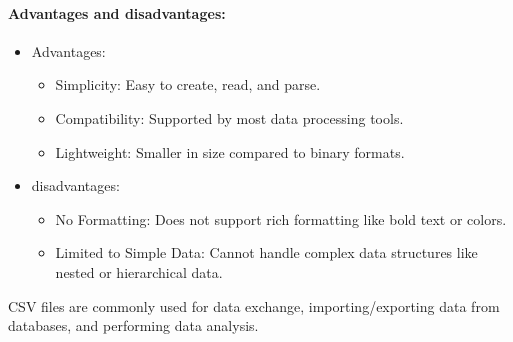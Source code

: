\documentclass[12pt]{article}
\begin{document}
\paragraph{Advantages and disadvantages:}
\begin{itemize}
    \item Advantages:\begin{itemize}
        \item Simplicity: Easy to create, read, and parse.
        \item Compatibility: Supported by most data processing tools.
        \item Lightweight: Smaller in size compared to binary formats.
    \end{itemize}
    \item disadvantages:\begin{itemize}
        \item No Formatting: Does not support rich formatting like bold text or colors.
        \item Limited to Simple Data: Cannot handle complex data structures like nested or hierarchical data.
    \end{itemize}
\end{itemize}
CSV files are commonly used for data exchange, importing/exporting data from databases, and performing data analysis.
\end{document}
